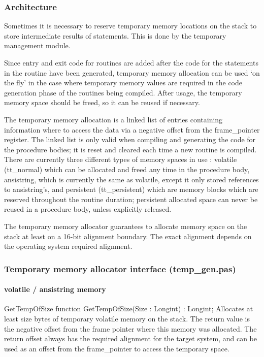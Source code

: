 \documentclass [a4paper,12pt]{article}
\begin{document}
\subsubsection{Architecture}
\label{subsubsec:architecturemory}

Sometimes it is necessary to reserve temporary memory locations on the stack
to store intermediate results of statements. This is done by the temporary
management module.

Since entry and exit code for routines are added after the code for the
statements in the routine have been generated, temporary memory allocation
can be used `on the fly' in the case where temporary memory values are
required in the code generation phase of the routines being compiled. After
usage, the temporary memory space should be freed, so it can be reused if
necessary.

The temporary memory allocation is a linked list of entries containing
information where to access the data via a negative offset from the
frame{\_}pointer register. The linked list is only valid when compiling and
generating the code for the procedure bodies; it is reset and cleared each
time a new routine is compiled. There are currently three different types of
memory spaces in use : volatile (\textsf{tt{\_}normal}) which can be
allocated and freed any time in the procedure body, ansistring, which is
currently the same as volatile, except it only stored references to
ansistring's, and persistent (\textsf{tt{\_}persistent}) which are memory
blocks which are reserved throughout the routine duration; persistent
allocated space can never be reused in a procedure body, unless explicitly
released.

The temporary memory allocator guarantees to allocate memory space on the
stack at least on a 16-bit alignment boundary. The exact alignment depends
on the operating system required alignment.

\subsubsection{Temporary memory allocator interface (temp{\_}gen.pas)}
\label{subsubsec:temporary}

\paragraph{volatile / ansistring memory}

\begin{function}{GetTempOfSize}
\Declaration
function GetTempOfSize(Size : Longint) : Longint;
\Description
Allocates at least \textsf{size} bytes of temporary volatile memory on the
stack. The return value is the negative offset from the frame pointer where
this memory was allocated.
\Notes
The return offset always has the required alignment for the target system,
and can be used as an offset from the frame{\_}pointer to access the
temporary space.
\end{function}
\end{document}
